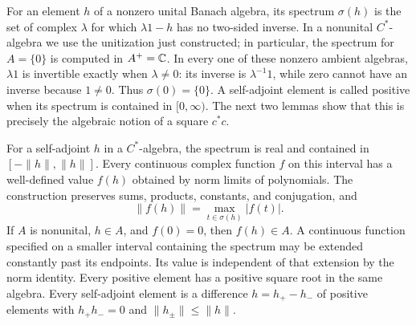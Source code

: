 For an element $h$ of a nonzero unital Banach algebra, its spectrum $\sigma(h)$
is the set of complex $\lambda$ for which $\lambda1-h$ has no two-sided
inverse.  In a nonunital $C^*$-algebra we use the unitization just constructed;
in particular, the spectrum for $A=\{0\}$ is computed in $A^+=\mathbb C$.
In every one of these nonzero ambient algebras, $\lambda1$ is invertible
exactly when $\lambda\ne0$: its inverse is $\lambda^{-1}1$, while zero
cannot have an inverse because $1\ne0$.  Thus $\sigma(0)=\{0\}$.
A self-adjoint element is called positive when its spectrum is contained in
$[0,\infty)$.  The next two lemmas show that this is precisely the algebraic
notion of a square $c^*c$.

\begin{lemma}
\label{lem:cstar-calculus}
For a self-adjoint $h$ in a $C^*$-algebra, the spectrum is real and contained
in $[-\|h\|,\|h\|]$.  Every continuous complex function $f$ on this interval
has a well-defined value $f(h)$ obtained by norm limits of polynomials.
The construction preserves sums, products, constants, and conjugation, and
\[
 \|f(h)\|=\max_{t\in\sigma(h)}|f(t)|.
\]
If $A$ is nonunital, $h\in A$, and $f(0)=0$, then $f(h)\in A$.
A continuous function specified on a smaller interval containing the spectrum
may be extended constantly past its endpoints.  Its value is independent
of that extension by the norm identity.
Every positive element has a positive square root in the same algebra.
Every self-adjoint element is a difference $h=h_+-h_-$ of positive elements
with $h_+h_-=0$ and $\|h_\pm\|\leq\|h\|$.
\end{lemma}

